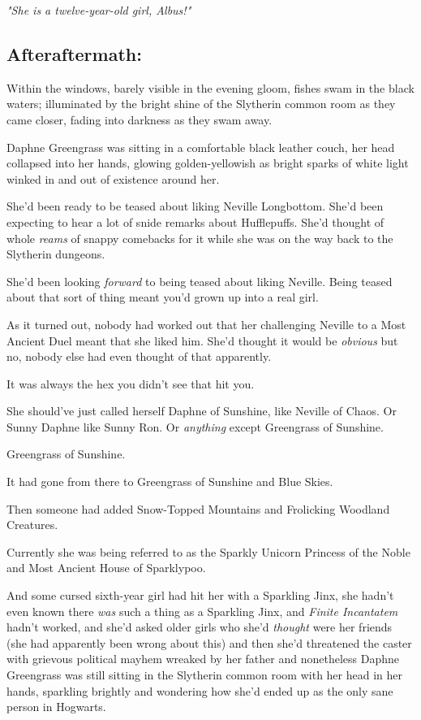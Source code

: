 \emph{"She is a twelve-year-old girl, Albus!"}
\sbreak
\subsection{Afteraftermath:}

Within the windows, barely visible in the evening gloom, fishes swam in the
black waters; illuminated by the bright shine of the Slytherin common room as
they came closer, fading into darkness as they swam away.

Daphne Greengrass was sitting in a comfortable black leather couch, her head
collapsed into her hands, glowing golden-yellowish as bright sparks of white
light winked in and out of existence around her.

She'd been ready to be teased about liking Neville Longbottom. She'd been
expecting to hear a lot of snide remarks about Hufflepuffs. She'd thought of
whole \emph{reams} of snappy comebacks for it while she was on the way back to
the Slytherin dungeons.

She'd been looking \emph{forward} to being teased about liking Neville. Being
teased about that sort of thing meant you'd grown up into a real girl.

As it turned out, nobody had worked out that her challenging Neville to a Most
Ancient Duel meant that she liked him. She'd thought it would be \emph{obvious}
but no, nobody else had even thought of that apparently.

It was always the hex you didn't see that hit you.

She should've just called herself Daphne of Sunshine, like Neville of Chaos. Or
Sunny Daphne like Sunny Ron. Or \emph{anything} except Greengrass of Sunshine.

Greengrass of Sunshine.

It had gone from there to Greengrass of Sunshine and Blue Skies.

Then someone had added Snow-Topped Mountains and Frolicking Woodland Creatures.

Currently she was being referred to as the Sparkly Unicorn Princess of the
Noble and Most Ancient House of Sparklypoo.

And some cursed sixth-year girl had hit her with a Sparkling Jinx, she hadn't
even known there \emph{was} such a thing as a Sparkling Jinx, and \emph{Finite
Incantatem} hadn't worked, and she'd asked older girls who she'd \emph{thought}
were her friends (she had apparently been wrong about this) and then she'd
threatened the caster with grievous political mayhem wreaked by her father and
nonetheless Daphne Greengrass was still sitting in the Slytherin common room
with her head in her hands, sparkling brightly and wondering how she'd ended up
as the only sane person in Hogwarts.

